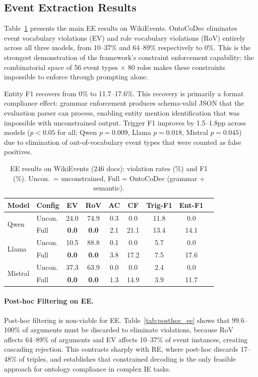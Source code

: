 \documentclass[11pt,a4paper]{article}
\newcommand{\sys}{OntoCoDec}
\newcommand{\bfval}[1]{\textbf{#1}}
\begin{document}
\subsection{Event Extraction Results}
\label{sec:ee_results}

Table~\ref{tab:ee_main} presents the main EE results on WikiEvents. \sys{} eliminates event vocabulary violations (EV) and role vocabulary violations (RoV) entirely across all three models, from 10--37\% and 64--89\% respectively to 0\%. This is the strongest demonstration of the framework's constraint enforcement capability: the combinatorial space of 56 event types $\times$ 80 roles makes these constraints impossible to enforce through prompting alone.

Entity F1 recovers from 0\% to 11.7--17.6\%. This recovery is primarily a format compliance effect: grammar enforcement produces schema-valid JSON that the evaluation parser can process, enabling entity mention identification that was impossible with unconstrained output. Trigger F1 improves by 1.5--1.8pp across models ($p<0.05$ for all; Qwen $p=0.009$, Llama $p=0.018$, Mistral $p=0.045$) due to elimination of out-of-vocabulary event types that were counted as false positives.

\begin{table}[t]
\centering
\small
\caption{EE results on WikiEvents (246 docs): violation rates (\%) and F1 (\%). Uncon.\ = unconstrained, Full = \sys{} (grammar + semantic).}
\label{tab:ee_main}
\begin{tabular}{llccccccc}
\toprule
Model & Config & EV & RoV & AC & CF & Trig-F1 & Ent-F1 \\
\midrule
\multirow{2}{*}{Qwen} & Uncon. & 24.0 & 74.9 & 0.3 & 0.0 & 11.8 & 0.0 \\
& Full & \bfval{0.0} & \bfval{0.0} & 2.1 & 21.1 & 13.4 & 14.1 \\
\midrule
\multirow{2}{*}{Llama} & Uncon. & 10.5 & 88.8 & 0.1 & 0.0 & 5.7 & 0.0 \\
& Full & \bfval{0.0} & \bfval{0.0} & 3.8 & 17.2 & 7.5 & 17.6 \\
\midrule
\multirow{2}{*}{Mistral} & Uncon. & 37.3 & 63.9 & 0.0 & 0.0 & 2.4 & 0.0 \\
& Full & \bfval{0.0} & \bfval{0.0} & 1.3 & 14.9 & 3.9 & 11.7 \\
\bottomrule
\end{tabular}
\end{table}

\paragraph{Post-hoc Filtering on EE.}
Post-hoc filtering is non-viable for EE. Table~\ref{tab:posthoc_ee} shows that 99.6--100\% of arguments must be discarded to eliminate violations, because RoV affects 64--89\% of arguments and EV affects 10--37\% of event instances, creating cascading rejection. This contrasts sharply with RE, where post-hoc discards 17--48\% of triples, and establishes that constrained decoding is the only feasible approach for ontology compliance in complex IE tasks.
\end{document}
